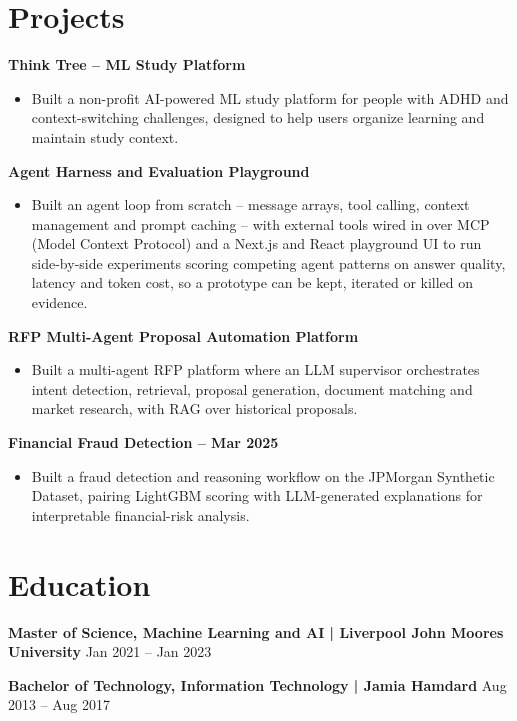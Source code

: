 \documentclass[10pt,a4paper]{article}
\begin{document}
\section{Projects}
\textbf{Think Tree -- ML Study Platform}\par
\begin{itemize}
  \item Built a non-profit AI-powered ML study platform for people with ADHD and context-switching challenges,
  designed to help users organize learning and maintain study context.
\end{itemize}
\textbf{Agent Harness and Evaluation Playground}\par
\begin{itemize}
  \item Built an agent loop from scratch -- message arrays, tool calling, context management and prompt caching --
  with external tools wired in over MCP (Model Context Protocol) and a Next.js and React playground UI to run
  side-by-side experiments scoring competing agent patterns on answer quality, latency and token cost, so a
  prototype can be kept, iterated or killed on evidence.
\end{itemize}
\textbf{RFP Multi-Agent Proposal Automation Platform}\par
\begin{itemize}
  \item Built a multi-agent RFP platform where an LLM supervisor orchestrates intent detection, retrieval,
  proposal generation, document matching and market research, with RAG over historical proposals.
\end{itemize}
\textbf{Financial Fraud Detection -- Mar 2025}\par
\begin{itemize}
  \item Built a fraud detection and reasoning workflow on the JPMorgan Synthetic Dataset, pairing LightGBM scoring
  with LLM-generated explanations for interpretable financial-risk analysis.
\end{itemize}

\section{Education}
\textbf{Master of Science, Machine Learning and AI | Liverpool John Moores University} \hfill Jan 2021 -- Jan 2023\par
\textbf{Bachelor of Technology, Information Technology | Jamia Hamdard} \hfill Aug 2013 -- Aug 2017\par
\end{document}
